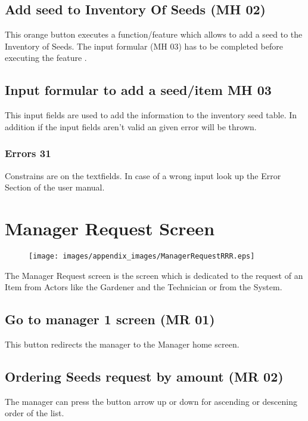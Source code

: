 \subsection{Add seed to Inventory Of Seeds (MH 02)}
This orange button executes a function/feature which allows to add a seed to 
the Inventory of Seeds. The input formular (MH 03) has to be completed before
executing the feature .

\subsection{Input formular to add a seed/item MH 03}
This input fields are used to add the information to the inventory seed table. In addition if the input fields aren't valid an given error will be thrown.

\subsubsection{Errors 31}
Constrains are on the textfields. In case of a wrong input look up the Error
Section of the user manual.


















\section{Manager Request Screen}
\label{sec:appendix_Manager_Request_Screen}

\begin{figure}[H]
\texttt{[image: images/appendix\_images/ManagerRequestRRR.eps]}
\end{figure}

The Manager Request screen is the screen which is dedicated to the request of an
Item from  Actors like the Gardener and the Technician or from the System. 


\subsection{Go to manager 1 screen (MR 01)}
This button redirects the manager to the Manager home screen.

\subsection{Ordering Seeds request by amount (MR 02)}
The manager can press the button arrow up or down for ascending or descening
order of the list.

